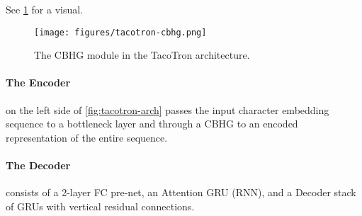 See \cref{fig:tacotron-cbhg} for a visual.

\begin{figure}[h!]
    \centering
    \texttt{[image: figures/tacotron-cbhg.png]}
    \caption{The CBHG module in the TacoTron architecture. }
    \label{fig:tacotron-cbhg}
\end{figure}

\paragraph{The Encoder} 
on the left side of \cref{fig:tacotron-arch} passes the input character embedding sequence 
to a bottleneck layer and through a CBHG to an encoded representation of the entire sequence.  


\paragraph{The Decoder} consists of a 2-layer FC pre-net, an Attention GRU (RNN), and a Decoder stack of GRUs with vertical residual connections. 

